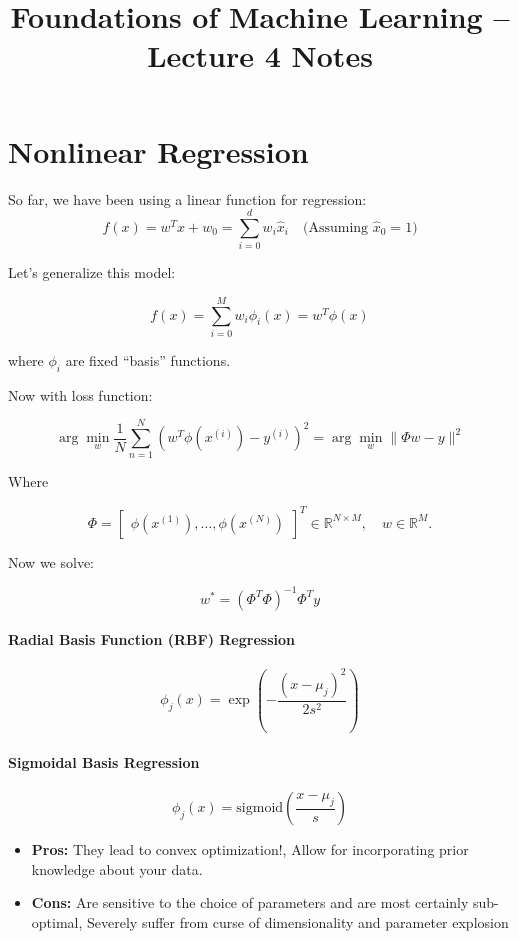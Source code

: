 \documentclass[11pt]{article}
\title{Foundations of Machine Learning -- Lecture 4 Notes}
\author{}
\date{}
\begin{document}
\maketitle

\section*{Nonlinear Regression}

So far, we have been using a linear function for regression:
\[
	f(x) = w^T x + w_0 = \sum_{i=0}^d w_i \hat{x}_i \quad \text{(Assuming $\hat{x}_0 = 1$)}
\]

Let’s generalize this model:

\[
	f(x) = \sum_{i=0}^M w_i \phi_i(x) = w^T \phi(x)
\]

where $\phi_i$ are fixed ``basis'' functions.

\medskip

Now with loss function:

\[
	\arg\min_{w} \frac{1}{N} \sum_{n=1}^N \left( w^T \phi(x^{(i)}) - y^{(i)} \right)^2
	= \arg\min_{w} \| \Phi w - y \|^2
\]

Where

\[
	\Phi = \begin{bmatrix}
		\phi(x^{(1)}), \ldots, \phi(x^{(N)})
	\end{bmatrix}^T \in \mathbb{R}^{N \times M},
	\quad w \in \mathbb{R}^M.
\]

Now we solve:

\[
	w^* = (\Phi^T \Phi)^{-1} \Phi^T y
\]

\paragraph*{Radial Basis Function (RBF) Regression}

\[
	\phi_j(x) = \exp\!\left(-\frac{(x - \mu_j)^2}{2s^2}\right)
\]

\paragraph*{Sigmoidal Basis Regression}
\[
	\phi_j(x) = \text{sigmoid}\!\left(\frac{x - \mu_j}{s}\right)
\]

\begin{itemize}
	\item \textbf{Pros:} They lead to convex optimization!, Allow for incorporating prior knowledge about your data.
	\item \textbf{Cons:} Are sensitive to the choice of parameters and are most
	      certainly sub-optimal, Severely suffer from curse of dimensionality and parameter
	      explosion
\end{itemize}
\end{document}
